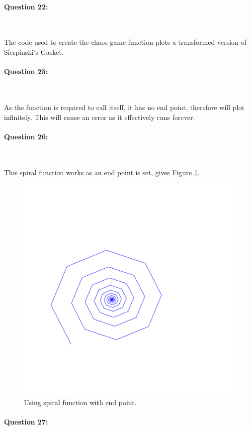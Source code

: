 \documentclass{article}
\begin{document}
\paragraph{Question 22:}\

\noindent \newline The code used to create the chaos game function plots a transformed version of Sierpinski's Gasket.

\paragraph{Question 25:}\

\noindent \newline As the function is required to call itself, it has no end point, therefore will plot infinitely. This will cause an error as it effectively runs forever.

\newpage
\paragraph{Question 26:}\

\noindent \newline This spiral function works as an end point is set, gives Figure \ref{fig:q26}.

\begin{figure}[H]
	\centering
	\includegraphics[width=0.5\linewidth,trim={2cm 3cm 6cm 5cm},clip]{../Results/spiral_2.pdf}
	\caption{Using spiral function with end point.}
	\label{fig:q26}
\end{figure}

\paragraph{Question 27:}\
\end{document}

